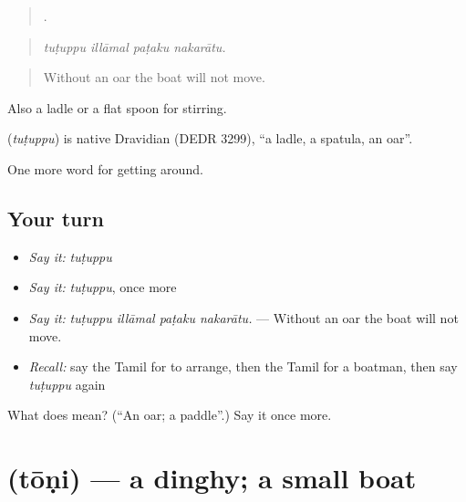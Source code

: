 \begin{quote}
   .
\end{quote}

\begin{quote}
\emph{tuṭuppu illāmal paṭaku nakarātu.}
\end{quote}

\begin{quote}
Without an oar the boat will not move.
\end{quote}

Also a ladle or a flat spoon for stirring.

\begin{cousinweb}
\textbf{} (\emph{tuṭuppu}) is native Dravidian (DEDR 3299), \textquotedblleft{}a ladle, a spatula, an oar\textquotedblright{}.
\end{cousinweb}

\begin{grammarlens}[title={What you've built}]
One more word for getting around.
\end{grammarlens}

\subsection*{Your turn}
\begin{itemize}
\raggedright
  \item \emph{Say it:} \emph{tuṭuppu}
  \item \emph{Say it:} \emph{tuṭuppu}, once more
  \item \emph{Say it:} \emph{tuṭuppu illāmal paṭaku nakarātu.} — Without an oar the boat will not move.
  \item \emph{Recall:} say the Tamil for to arrange, then the Tamil for a boatman, then say \emph{tuṭuppu} again
\end{itemize}

\begin{tcolorbox}[breakable,colback=teal!4,colframe=teal!35!black,title={Before you move on}]
What does  mean? (\textquotedblleft{}An oar; a paddle\textquotedblright{}.) Say it once more.
\end{tcolorbox}
\section[\texorpdfstring{\ta{தோணி} (tōṇi)}{தோணி (tōṇi)}]{ (tōṇi) — a dinghy; a small boat}

\label{lesson:TA-C416-toni}



